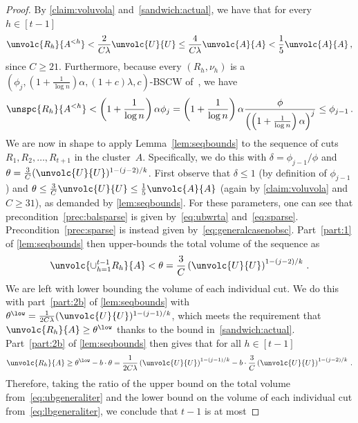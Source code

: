 \begin{proof}
	\noindent
	By \cref{claim:voluvola} and~\eqref{sandwich:actual}, we have that for every $h \in [t-1]$
	\begin{equation}
		\label{eq:ubwrta}
		\unvolc{R_h}{A^{<h}} < \frac{2}{C\lambda}\unvolc{U}{U} \le \frac{4}{C\lambda}\unvolc{A}{A} < \frac{1}{5}\unvolc{A}{A} \, ,
	\end{equation}
	since $C \ge 21$. Furthermore, because every $(R_h,\nu_h)$ is a $(\phi_j,(1+\frac{1}{\log n})\alpha,(1+c)\lambda,c)$-BSCW of~, we have
	\begin{equation}
		\label{eq:sparse}
		\unspc{R_h}{A^{<h}} < \left(1+\frac{1}{ \log n}\right) \alpha \phi_{j} = \left(1+\frac{1}{ \log n}\right) \alpha \frac{\phi}{\left( \left(1+\frac{1}{ \log n}\right) \alpha\right)^{j}}  \le \phi_{j-1} \, .
	\end{equation}
	We are now in shape to apply Lemma~\ref{lem:seqbounds} to the sequence of cuts $R_1,R_2, \dots, R_{t+1}$ in the cluster~$A$. Specifically, we do this with $\delta=\phi_{j-1}/\phi$ and $\theta = \frac{3}{C}(\unvolc{U}{U})^{1-(j-2)/k}$. First observe that $\delta \le 1$ (by definition of $\phi_{j-1}$) and $ \theta \le  \frac{3}{C}\unvolc{U}{U} \le \frac{1}{5}\unvolc{A}{A}$ (again by \cref{claim:voluvola} and $C \ge 31$), as demanded by \cref{lem:seqbounds}. For these parameters, one can see that precondition~\eqref{prec:balsparse} is given by~\eqref{eq:ubwrta} and~\eqref{eq:sparse}. Precondition~\eqref{prec:sparse} is instead given by~\eqref{eq:generalcasenobsc}. Part~\eqref{part:1} of \cref{lem:seqbounds} then upper-bounds the total volume of the sequence as
	\begin{equation}
		\label{eq:ubgeneraliter}
		\unvolc{\cup_{h=1}^{t-1} R_h}{A} < \theta =  \frac{3}{C}\left(\unvolc{U}{U}\right)^{1-(j-2)/k} \, .
	\end{equation}
	We are left with lower bounding the volume of each individual cut. We do this with part~\eqref{part:2b} of \cref{lem:seqbounds} with $\theta^{\low} = \frac{1}{2C\lambda}(\unvolc{U}{U})^{1-(j-1)/k}$, which meets the requirement that $	\unvolc{R_h}{A} \ge \theta^{\low}$ thanks to the bound in~\eqref{sandwich:actual}. Part~\eqref{part:2b} of \cref{lem:seqbounds} then gives that for all $h \in [t-1]$
	\begin{align}
			\label{eq:lbgeneraliter}
		\unvolc{R_h}{A} \ge \theta^{\low} - b \cdot \theta = \frac{1}{2C\lambda}\left(\unvolc{U}{U}\right)^{1-(j-1)/k} - b \cdot  \frac{3}{C}\left(\unvolc{U}{U}\right)^{1-(j-2)/k}\, .
	\end{align}
	Therefore, taking the ratio of the upper bound on the total volume from~\eqref{eq:ubgeneraliter} and the lower bound on the volume of each individual cut from~\eqref{eq:lbgeneraliter}, we conclude that $t-1$ is at most

\end{proof}
